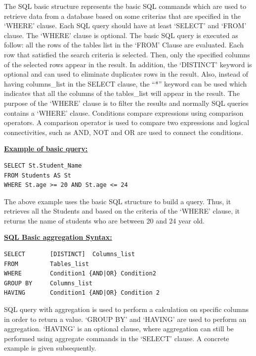 The SQL basic structure represents the basic SQL commands which are used to retrieve data from a database based on some criterias  that are specified  in the ‘WHERE’ clause. Each SQL query should have at least ‘SELECT’ and ‘FROM’ clause.  The ‘WHERE’ clause is optional. The basic SQL query is executed as follow: all the rows of the tables list in the ‘FROM’ Clause are evaluated. Each row that satisfied the search criteria is selected. Then, only the specified columns of the selected rows appear in the result. In addition,  the ‘DISTINCT’ keyword is optional and can used to eliminate duplicates rows in the result. Also, instead of having columns\_list in the SELECT clause, the “*” keyword can be used which indicates that all the columns of the tables\_list will appear in the result. The purpose of the ‘WHERE’ clause is to filter the results and normally SQL queries contains a ‘WHERE’ clause. Conditions compare expressions using comparison operators. A comparison operator is used to compare two expressions and logical connectivities, such as AND, NOT and OR are used to connect the conditions.  

\hfill\newline
\noindent\textbf{\underline{Example of basic query:}}
\begin{mdframed}[backgroundcolor=lightgray!20] 
\begin{lstlisting}[style=SQL]
SELECT St.Student_Name
FROM Students AS St 
WHERE St.age >= 20 AND St.age <= 24
\end{lstlisting}
\end{mdframed}

The above example uses the basic SQL structure to build a query. Thus, it retrieves all the Students and based on the criteria of the ‘WHERE’ clause, it returns the name of students who are between 20 and 24 year old. 

\hfill\newline
\noindent\textbf{\underline{SQL Basic aggregation Syntax:}}
\begin{mdframed}[backgroundcolor=lightgray!20] 
\begin{lstlisting}[style=SQL]
SELECT       [DISTINCT]  Columns_list
FROM         Tables_list
WHERE        Condition1 {AND|OR} Condition2
GROUP BY     Columns_list
HAVING       Condition1 {AND|OR} Condition 2
\end{lstlisting}
\end{mdframed}

SQL query with aggregation is used to perform a calculation on specific columns in order to return a value. ‘GROUP BY’ and ‘HAVING’ are used to perform an aggregation. ‘HAVING’ is an optional clause, where aggregation can still be performed using aggregate commands in the ‘SELECT’ clause. A concrete example is given subsequently. 

